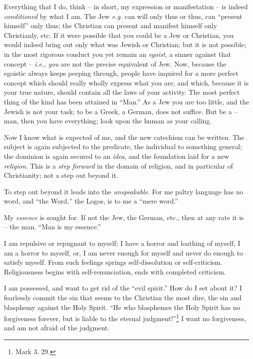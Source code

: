 \documentclass[12pt,a4paper]{book}
\begin{document}
Everything that I do, think -- in short, my expression or manifestation -- is 
indeed \textit{conditioned} by what I am. The Jew \textit{e.g.} can will only 
thus or thus, can ``present himself'' only thus; the Christian can present 
and manifest himself only Christianly, etc. If it were possible that you could 
be a Jew or Christian, you would indeed bring out only what was Jewish or 
Christian; but it is not possible; in the most rigorous conduct you yet remain 
an \textit{egoist}, a sinner against that concept -- \textit{i.e.}, 
\textit{you} are not the precise equivalent of Jew. Now, because the egoistic 
always keeps peeping through, people have inquired for a more perfect concept 
which should really wholly express what you are, and which, because it is your 
true nature, should contain all the laws of your activity. The most perfect 
thing of the kind has been attained in ``Man.'' As a Jew you are too little, 
and the Jewish is not your task; to be a Greek, a German, does not suffice. 
But be a -- man, then you have everything; look upon the human as your 
calling.

Now I know what is expected of me, and the new catechism can be written. The 
subject is again subjected to the predicate, the individual to something 
general; the dominion is again secured to an \textit{idea}, and the foundation 
laid for a new \textit{religion}. This is a \textit{step forward} in the 
domain of religion, and in particular of Christianity; not a step out beyond 
it.

To step out beyond it leads into the \textit{unspeakable}. For me paltry 
language has no word, and ``the Word,'' the Logos, is to me a ``mere 
word.''

My \textit{essence} is sought for. If not the Jew, the German, etc., then at 
any rate it is -- the man. ``Man is my essence.''

I am repulsive or repugnant to myself; I have a horror and loathing of myself, 
I am a horror to myself, or, I am never enough for myself and never do enough 
to satisfy myself. From such feelings springs self-dissolution or 
self-criticism. Religiousness begins with self-renunciation, ends with 
completed criticism.

I am possessed, and want to get rid of the ``evil spirit.'' How do I set 
about it? I fearlessly commit the sin that seems to the Christian the most 
dire, the sin and blasphemy against the Holy Spirit. ``He who blasphemes the 
Holy Spirit has no forgiveness forever, but is liable to the eternal 
judgment!''\footnote{Mark 3. 29.} I want no forgiveness, and am not afraid of 
the judgment.
\end{document}

